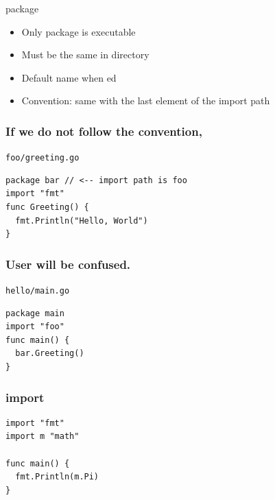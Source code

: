 \documentclass[xetex,mathserif,serif,12pt]{beamer}
\begin{document}
\begin{frame}{\ttfamily package}
  \begin{itemize}
  \item Only package  is executable
  \item Must be the same in directory
  \item Default name when ed
  \item Convention: same with the last element of the import path
  \end{itemize}
\end{frame}

\begin{frame}[fragile]
  \frametitle{If we do not follow the convention,}

  \begin{beamer@nomargin@title}
    \texttt{\alert{foo}/greeting.go}
  \end{beamer@nomargin@title}

  \begin{beamer@nomargin}
    \begin{lstlisting}[basicstyle=\small\ttfamily]
package bar // <-- import path is foo
import "fmt"
func Greeting() {
  fmt.Println("Hello, World")
}
    \end{lstlisting}
  \end{beamer@nomargin}
\end{frame}

\begin{frame}[fragile]
  \frametitle{User will be confused.}

  \begin{beamer@nomargin@title}
    \texttt{hello/main.go}
  \end{beamer@nomargin@title}

  \begin{beamer@nomargin}
    \begin{lstlisting}[basicstyle=\small\ttfamily]
package main
import "foo"
func main() {
  bar.Greeting()
}
    \end{lstlisting}
  \end{beamer@nomargin}
\end{frame}

\begin{frame}[fragile]
  \frametitle{\ttfamily import}

  \begin{beamer@nomargin}
    \begin{lstlisting}[basicstyle=\small\ttfamily]
import "fmt"
import m "math"

func main() {
  fmt.Println(m.Pi)
}
    \end{lstlisting}
  \end{beamer@nomargin}
\end{frame}
\end{document}
